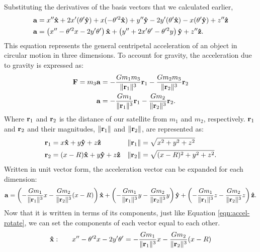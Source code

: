\begin{samepage}
Substituting the derivatives of the basis vectors that we calculated earlier,
\begin{align}
	\bvec{a} &= x''\uvec{x} + 2x'(\theta'\uvec{y}) + x(- \theta'^2\uvec{x}) + y''\uvec{y} - 2y'(\theta'\uvec{x}) - x(\theta'\uvec{y}) + z''\uvec{z} \nonumber \\
	\bvec{a} &= \left(x'' - \theta'^2x - 2y'\theta'\right)\uvec{x} + \left(y'' + 2x'\theta' - \theta'^2y\right)\uvec{y} + z''\uvec{z} \label{eqn:accel-rotate} \text{.}
\end{align}
This equation represents the general centripetal acceleration of an object in circular motion in three dimensions.
To account for gravity, the acceleration due to gravity is expressed as:
\begin{align*}
	\bm{\mathbf{F}} = m_3\bm{\mathbf{a}} &= - \frac{Gm_1m_3}{\|\bm{\mathbf{r}}_1\|^3}\bm{\mathbf{r}}_1 - \frac{Gm_2m_3}{\|\bm{\mathbf{r}}_2\|^3}\bm{\mathbf{r}}_2 \\
	\bm{\mathbf{a}} &= - \frac{Gm_1}{\|\bm{\mathbf{r}}_1\|^3}\bm{\mathbf{r}}_1 - \frac{Gm_2}{\|\bm{\mathbf{r}}_2\|^3}\bm{\mathbf{r}}_2 \text{.}
\end{align*}
Where $\bm{\mathbf{r}}_1$ and $\bm{\mathbf{r}}_2$ is the distance of our satellite from $m_1$ and $m_2$, respectively.
$\bm{\mathbf{r}}_1$ and $\bm{\mathbf{r}}_2$ and their magnitudes, $\|\bm{\mathbf{r}}_1\|$ and $\|\bm{\mathbf{r}}_2\|$, are represented as:
\begin{align*}
	\bvec{r}_1 &= x\uvec{x} + y\uvec{y} + z\uvec{z} & \|\bvec{r}_1\| &= \sqrt{x^2 + y^2 + z^2} \\
	\bvec{r}_2 &= (x - R)\uvec{x} + y\uvec{y} + z\uvec{z} & \|\bvec{r}_2\| &= \sqrt{(x - R)^2 + y^2 + z^2} \text{.}
\end{align*}
Written in unit vector form, the acceleration vector can be expanded for each dimension:
\begin{equation*}
	\bvec{a} = \left(-\frac{Gm_1}{\|\bvec{r}_1\|^3}x - \frac{Gm_2}{\|\bvec{r}_2\|^3}(x - R)\right)\uvec{x} + \left(-\frac{Gm_1}{\|\bvec{r}_1\|^3}y - \frac{Gm_2}{\|\bvec{r}_2\|^3}y\right)\uvec{y} + \left(-\frac{Gm_1}{\|\bvec{r}_1\|^3}z - \frac{Gm_2}{\|\bvec{r}_2\|^3}z\right)\uvec{z} \text{.}
\end{equation*}
Now that it is written in terms of its components, just like Equation \eqref{eqn:accel-rotate}, we can set the components of each vector equal to each other.
\begin{align*}
	\uvec{x} : \qquad &x'' - \theta'^2x - 2y'\theta' = -\frac{Gm_1}{\|\bvec{r}_1\|^3}x - \frac{Gm_2}{\|\bvec{r}_2\|^3}(x - R) \\

\end{align*}
\end{samepage}
